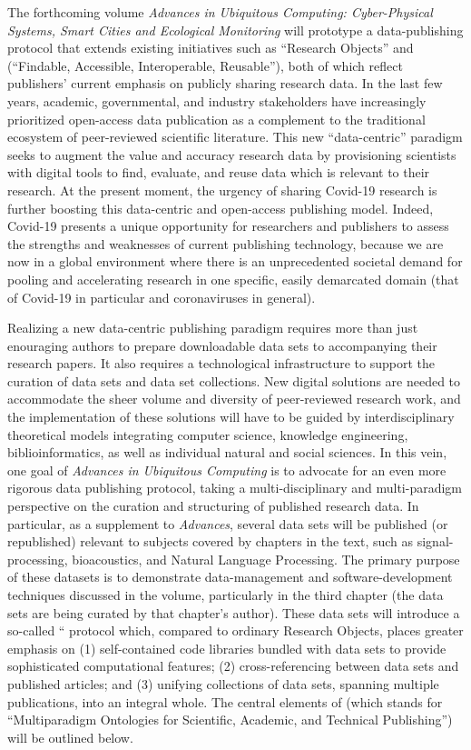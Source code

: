 \documentclass[11pt,letterpaper]{article}
\newcommand{\FAIR}{\resizebox{!}{7pt}{\AcronymText{FAIR}}}
\newcommand{\textscc}[1]{{\color{orr!35!black}{{%
						\fontfamily{Cabin-TLF}\fontseries{b}\selectfont{\textsc{\scriptsize{#1}}}}}}}
\newcommand{\AcronymText}[1]{{\textscc{#1}}}
\newcommand{\MOSAIC}{\resizebox{!}{7pt}{\AcronymText{MOSAIC}}}
\newcommand{\p}[1]{

\vspace{.85em}#1}
\newcommand{\q}[1]{{\fontfamily{qcr}\selectfont ``}#1{\fontfamily{qcr}\selectfont ''}}
\begin{document}
{\p{The forthcoming volume \textit{Advances in Ubiquitous Computing: 
Cyber-Physical Systems, Smart Cities and Ecological Monitoring} will 
prototype a data-publishing protocol that extends 
existing initiatives such as \q{Research Objects} 
and \FAIR{} (\q{Findable, Accessible, 
Interoperable, Reusable}), both of which 
reflect publishers' current emphasis on 
publicly sharing research data.  In the last 
few years, academic, governmental, and 
industry stakeholders have increasingly 
prioritized open-access data publication as a 
complement to the traditional ecosystem of 
peer-reviewed scientific literature.  
This new \q{data-centric} paradigm seeks to 
augment the value and accuracy research 
data by provisioning scientists with digital 
tools to find, evaluate, and reuse data 
which is relevant to their research.  
At the present moment, the urgency of sharing Covid-19 
research is further boosting this data-centric and open-access publishing model.  Indeed, Covid-19 
presents a unique opportunity for researchers 
and publishers to assess the strengths and 
weaknesses of current publishing technology, 
because we are now in a global environment where there 
is an unprecedented societal demand 
for pooling and accelerating research in 
one specific, easily demarcated domain 
(that of Covid-19 in particular and 
coronaviruses in general).}

\p{Realizing a new data-centric publishing paradigm 
requires more than just enouraging authors to 
prepare downloadable data sets to accompanying their research 
papers.  It also requires a technological 
infrastructure to support the curation of 
data sets and data set collections.  New digital solutions 
are needed to accommodate the sheer volume and diversity of 
peer-reviewed research work, and the implementation of 
these solutions will have to be guided by interdisciplinary 
theoretical models integrating computer science, knowledge 
engineering, biblioinformatics, as well as individual 
natural and social sciences.  In this vein, 
one goal of \textit{Advances in Ubiquitous Computing} 
is to advocate for an even more rigorous data publishing 
protocol, taking a multi-disciplinary and multi-paradigm 
perspective on the curation and structuring of 
published research data.  In particular, as a supplement to 
\textit{Advances}, several data sets will be published (or 
republished) relevant to subjects covered by 
chapters in the text, such as signal-processing, 
bioacoustics, and Natural Language Processing.  
The primary purpose of these datasets is to demonstrate 
data-management and software-development techniques 
discussed in the volume, particularly in the 
third chapter (the data sets are being curated by that 
chapter's author).  These data sets will introduce a 
so-called \q{\MOSAIC{}} protocol which, 
compared to ordinary Research Objects, 
places greater emphasis on (1) self-contained 
code libraries bundled with data sets to provide 
sophisticated computational features; (2) 
cross-referencing between data sets and published 
articles; and (3) unifying collections of data sets, 
spanning multiple publications, into an integral whole.  
The central elements of \MOSAIC{} (which stands for 
\q{Multiparadigm Ontologies for Scientific, Academic, 
and Technical Publishing}) will be outlined below.}

}
\end{document}
